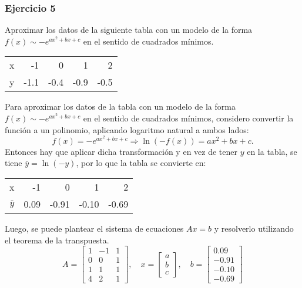 \documentclass{article}
\begin{document}
\subsubsection{Ejercicio 5}
Aproximar los datos de la siguiente tabla con un modelo de la forma $f(x) \sim -e^{ax^2+bx+c}$ en el sentido de cuadrados mínimos.
\begin{center}
\begin{tabular}{||r||r|r|r|r||}
\hline
x & -1 & 0 & 1 & 2\\
y & -1.1 & -0.4 & -0.9 & -0.5\\
\hline
\end{tabular}
\end{center}
Para aproximar los datos de la tabla con un modelo de la forma \( f(x) \sim -e^{ax^2+bx+c} \) en el sentido de cuadrados mínimos, considero convertir la función a un polinomio, aplicando logaritmo natural a ambos lados:
\[
f(x) = -e^{ax^2+bx+c} \Rightarrow \ln(-f(x)) = ax^2 + bx + c.
\]
Entonces hay que aplicar dicha transformación y en vez de tener \( y \) en la tabla, se tiene \( \overline{y} = \ln(-y) \), por lo que la tabla se convierte en:
\begin{center}
\begin{tabular}{||r||r|r|r|r||}
\hline
x & -1 & 0 & 1 & 2\\
$\overline{y}$ & 0.09 & -0.91 & -0.10 & -0.69\\
\hline
\end{tabular}
\end{center}
Luego, se puede plantear el sistema de ecuaciones \( Ax = b \) y resolverlo utilizando el teorema de la transpuesta.
\begin{equation}
    A = \begin{bmatrix}
        1 & -1 & 1 \\
        0 & 0 & 1 \\
        1 & 1 & 1 \\
        4 & 2 & 1
    \end{bmatrix}, \quad x = \begin{bmatrix}
        a \\
        b \\
        c
    \end{bmatrix}, \quad b = \begin{bmatrix}
        0.09 \\
        -0.91 \\
        -0.10 \\
        -0.69
    \end{bmatrix}
\end{equation}
\end{document}
